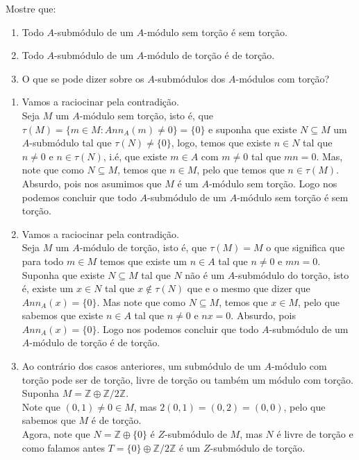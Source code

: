 \begin{homeworkProblem}[3]
  Mostre que:
  \begin{enumerate}
    \item Todo $A$-submódulo de um $A$-módulo sem torção é sem torção.
    \item Todo $A$-submódulo de um $A$-módulo de torção é de torção.
    \item O que se pode dizer sobre os $A$-submódulos dos $A$-módulos com torção?
  \end{enumerate}
  \begin{solution}
  \begin{enumerate}
    \item Vamos a raciocinar pela contradição.\\
      Seja $M$ um $A$-módulo sem torção, isto é, que $\tau(M)=\{m\in M:Ann_{A}(m)\neq 0\}=\{0\}$ e suponha que existe $N\subseteq M$ um $A$-submódulo tal que $\tau(N)\neq\{0\}$, logo, temos que existe $n\in N$ tal que $n\neq 0$ e $n\in\tau(N)$, i.é, que existe $m\in A$ com $m\neq 0$ tal que $mn=0$. Mas, note que como $N\subseteq M$, temos que $n\in M$, pelo que temos que $n\in\tau(M)$. Absurdo, pois nos asumimos que $M$ é um $A$-módulo sem torção. Logo nos podemos concluir que todo $A$-submódulo de um $A$-módulo sem torção é sem torção.
    \item Vamos a raciocinar pela contradição.\\
      Seja $M$ um $A$-módulo de torção, isto é, que $\tau(M)=M$ o que significa que para todo $m\in M$ temos que existe um $n\in A$ tal que $n\neq 0$ e $mn=0$. Suponha que existe $N\subseteq M$ tal que $N$ não é um $A$-submódulo do torção, isto é, existe um $x\in N$ tal que $x\notin\tau(N)$ que e o mesmo que dizer que $Ann_A(x)=\{0\}$. Mas note que como $N\subseteq M$, temos que $x\in M$, pelo que sabemos que existe $n\in A$ tal que $n\neq 0$ e $nx=0$. Absurdo, pois $Ann_{A}(x)=\{0\}$. Logo nos podemos concluir que todo $A$-submódulo de um $A$-módulo de torção é de torção.
    \item Ao contrário dos casos anteriores, um submódulo de um $A$-módulo com torção pode ser de torção, livre de torção ou também um módulo com torção.\\
      Suponha $M=\mathbb{Z}\oplus \mathbb{Z}/2\mathbb{Z}$.\\
      Note que $(0,1)\neq 0\in M$, mas $2(0,1)=(0,2)=(0,0)$, pelo que sabemos que $M$ é de torção.\\
      Agora, note que $N=\mathbb{Z}\oplus\{0\}$ é $Z$-submódulo de $M$, mas $N$ é livre de torção e como falamos antes $T=\{0\}\oplus\mathbb{Z}/2\mathbb{Z}$ é um $Z$-submódulo de torção. 
  \end{enumerate}
  \end{solution}
\end{homeworkProblem}
